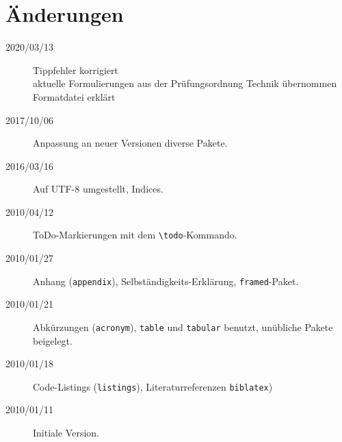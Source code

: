 
\chapter*{Änderungen}

\begin{description}
\item[2020/03/13] Tippfehler korrigiert\\
                  aktuelle Formulierungen aus der Prüfungsordnung Technik übernommen\\
                  Formatdatei erklärt
\item[2017/10/06] Anpassung an neuer Versionen diverse Pakete.
\item[2016/03/16] Auf UTF-8 umgestellt, Indices.
\item[2010/04/12] ToDo-Markierungen mit dem \verb+\todo+-Kommando.
\item[2010/01/27] Anhang (\texttt{appendix}), Selbständigkeits-Erklärung, \texttt{framed}-Paket.
\item[2010/01/21] Abkürzungen (\texttt{acronym}), \texttt{table} und \texttt{tabular} benutzt,
     unübliche Pakete beigelegt.
\item[2010/01/18] Code-Listings (\texttt{listings}), Literaturreferenzen \texttt{biblatex})
\item[2010/01/11] Initiale Version.
\end{description}
